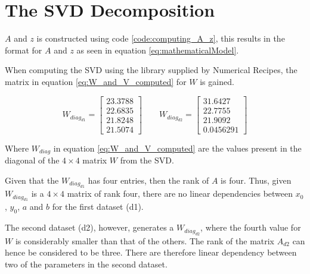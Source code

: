 \section{The SVD Decomposition}

$A$ and $z$ is constructed using code \ref{code:computing_A_z}, this results in the format for $A$ and $z$ as seen in equation \ref{eq:mathematicalModel}.



When computing the SVD using the library supplied by Numerical Recipes, the matrix in equation \ref{eq:W_and_V_computed} for $W$
is gained.

\begin{equation}
W_{diag_{d1}} = 
\left[
\begin{array}{c}
23.3788 \\
22.6835 \\
21.8248 \\
21.5074
\end{array}
\right]
% 
\qquad
% 
W_{diag_{d2}} = 
\left[
\begin{array}{c}
31.6427\\
22.7755\\
21.9092\\
0.0456291
\end{array}
\right]
\label{eq:W_and_V_computed}
\end{equation}

Where $W_{diag}$ in equation \ref{eq:W_and_V_computed} are the values present in the diagonal of the $4 \times 4$ matrix $W$ from the SVD.

Given that the $W_{diag_{d1}}$ has four entries, then the rank of $A$ is four. 
Thus, given $W_{diag_{d1}}$ is a $4 \times 4$ matrix of rank four, there are no linear dependencies between $x_0$, $y_0$, $a$ and $b$ for the first dataset (d1).

The second dataset (d2), however, generates a $W_{diag_{d2}}$, where the fourth value for $W$ is considerably smaller than that of the others.
The rank of the matrix $A_{d2}$ can hence be considered to be three.
There are therefore linear dependency between two of the parameters in the second dataset.


